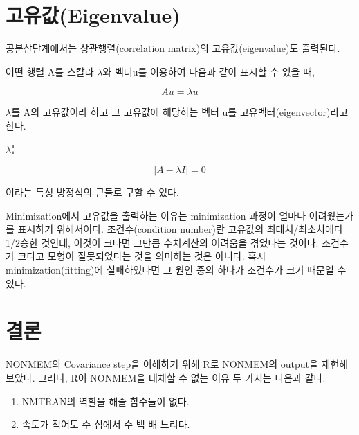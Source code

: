 \documentclass[
  11pt,
  krantz2, a4paper, twoside]{krantz}
\providecommand{\tightlist}{%
  \setlength{\itemsep}{0pt}\setlength{\parskip}{0pt}}
\theoremstyle{definition}
\theoremstyle{definition}
\theoremstyle{definition}
\theoremstyle{remark}
\begin{document}
\hypertarget{eigenvalue}{%
\section{고유값(Eigenvalue)}\label{eigenvalue}}


공분산단계에서는 상관행렬(correlation matrix)의 고유값(eigenvalue)도 출력된다.

어떤 행렬 A를 스칼라 \(\lambda\)와 벡터u를 이용하여 다음과 같이 표시할 수 있을 때,

\begin{equation}
Au = \lambda u
\label{eq:au-lu}
\end{equation}

\(\lambda\)를 A의 고유값이라 하고 그 고유값에 해당하는 벡터 u를 고유벡터(eigenvector)라고 한다.

\(\lambda\)는

\begin{equation}
\left| A - \lambda I \right| = 0
\label{eq:a-li-zero}
\end{equation}

이라는 특성 방정식의 근들로 구할 수 있다.

Minimization에서 고유값을 출력하는 이유는 minimization 과정이 얼마나 어려웠는가를 표시하기 위해서이다. 조건수(condition number)란 고유값의 최대치/최소치에다 1/2승한 것인데, 이것이 크다면 그만큼 수치계산의 어려움을 겪었다는 것이다. 조건수가 크다고 모형이 잘못되었다는 것을 의미하는 것은 아니다. 혹시 minimization(fitting)에 실패하였다면 그 원인 중의 하나가 조건수가 크기 때문일 수 있다.

\hypertarget{uxacb0uxb860}{%
\section{결론}\label{uxacb0uxb860}}

NONMEM의 Covariance step을 이해하기 위해 R로 NONMEM의 output을 재현해 보았다. 그러나, R이 NONMEM을 대체할 수 없는 이유 두 가지는 다음과 같다.

\begin{enumerate}
\def\labelenumi{\arabic{enumi}.}
\tightlist
\item
  NMTRAN의 역할을 해줄 함수들이 없다.
\item
  속도가 적어도 수 십에서 수 백 배 느리다.
\end{enumerate}
\end{document}
